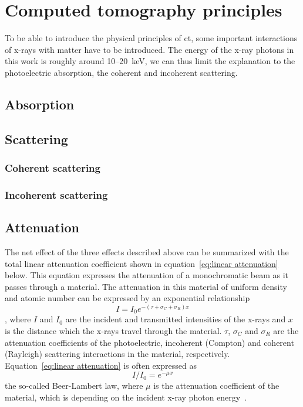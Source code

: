 \section{Computed tomography principles}
To be able to introduce the physical principles of \ac{ct}, some important interactions of x-rays with matter have to be introduced. The energy of the x-ray photons in this work is roughly around 10--\SI{20}{\kilo\electronvolt}, we can thus limit the explanation to the photoelectric absorption, the coherent and incoherent scattering.

\subsection{Absorption}
\subsection{Scattering}
\subsubsection{Coherent scattering}
\subsubsection{Incoherent scattering}

\subsection{Attenuation}
The net effect of the three effects described above can be summarized with the total linear attenuation coefficient shown in equation~\ref{eq:linear attenuation} below. This equation expresses the attenuation of a monochromatic beam as it passes through a material. The attenuation in this material of uniform density and atomic number can be expressed by an exponential relationship%
\begin{equation}%
	I=I_{0}e^{-(\tau+\sigma_{C}+\sigma_{R})x}%
	\label{eq:linear attenuation}%
\end{equation}%
, where $I$ and $I_{0}$ are the incident and transmitted intensities of the x-rays and $x$ is the distance which the x-rays travel through the material. $\tau$, $\sigma_{C}$ and $\sigma_{R}$ are the attenuation coefficients of the photoelectric, incoherent (Compton) and coherent (Rayleigh) scattering interactions in the material, respectively. Equation~\ref{eq:linear attenuation} is often expressed as
\begin{equation}
	I/I_{0}=e^{-\mu x}
	\label{eq:beer-lambert}
\end{equation}%
the so-called Beer-Lambert law, where $\mu$ is the attenuation coefficient of the material, which is depending on the incident x-ray photon energy~\cite{Hsieh2003}. 

